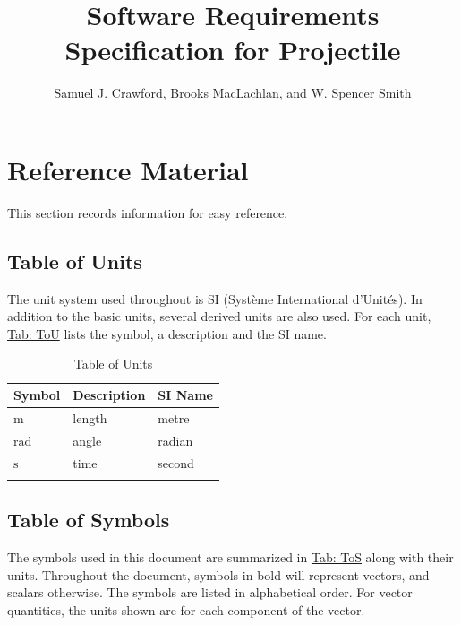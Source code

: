 \documentclass[12pt]{article}
\title{Software Requirements Specification for Projectile}
\author{Samuel J. Crawford, Brooks MacLachlan, and W. Spencer Smith}
\begin{document}
\maketitle
\tableofcontents
\newpage
\section{Reference Material}
\label{Sec:RefMat}
This section records information for easy reference.

\subsection{Table of Units}
\label{Sec:ToU}
The unit system used throughout is SI (Système International d'Unités). In addition to the basic units, several derived units are also used. For each unit, \hyperref[Table:ToU]{Tab: ToU} lists the symbol, a description and the SI name.

\begin{longtable}{l l l}
\toprule
\textbf{Symbol} & \textbf{Description} & \textbf{SI Name}
\\
\midrule
\endhead
${\text{m}}$ & length & metre
\\
${\text{rad}}$ & angle & radian
\\
${\text{s}}$ & time & second
\\
\bottomrule
\caption{Table of Units}
\label{Table:ToU}
\end{longtable}
\subsection{Table of Symbols}
\label{Sec:ToS}
The symbols used in this document are summarized in \hyperref[Table:ToS]{Tab: ToS} along with their units. Throughout the document, symbols in bold will represent vectors, and scalars otherwise. The symbols are listed in alphabetical order. For vector quantities, the units shown are for each component of the vector.
\end{document}
